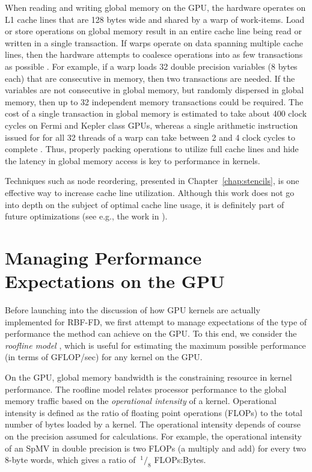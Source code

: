 \documentclass{report}
\begin{document}
When reading and writing global memory on the GPU, the hardware operates on L1 cache lines that are 128 bytes wide and shared by a warp of work-items. Load or store operations on global memory result in an entire cache line being read or written in a single transaction. If warps operate on data spanning multiple cache lines, then the hardware attempts to coalesce operations into as few transactions as possible \cite{CudaGuide2013}. For example, if a warp loads 32 double precision variables (8 bytes each) that are consecutive in memory, then two transactions are needed. If the variables are not consecutive in global memory, but randomly dispersed in global memory, then up to 32 independent memory transactions could be required. The cost of a single transaction in global memory is estimated to take about 400 clock cycles on Fermi and Kepler class GPUs, whereas a single arithmetic instruction issued for for all 32 threads of a warp can take between 2 and 4 clock cycles to complete \cite{CudaGuide2013}. Thus, properly packing operations to utilize full cache lines and hide the latency in global memory access is key to performance in kernels. 

Techniques such as node reordering, presented in Chapter~\ref{chap:stencils}, is one effective way to increase cache line utilization. Although this work does not go into depth on the subject of optimal cache line usage, it is definitely part of future optimizations (see e.g., the work in \cite{ErlebacherSauleFlyerBollig2013}). 



\section{Managing Performance Expectations on the GPU}

Before launching into the discussion of how GPU kernels are actually implemented for RBF-FD, we first attempt to manage expectations of the type of performance the method can achieve on the GPU. To this end, we consider the \emph{roofline model} \cite{Williams2009}, which is useful for estimating the maximum possible performance (in terms of GFLOP/sec) for any kernel on the GPU. 
 
On the GPU, global memory bandwidth is the constraining resource in kernel performance. The roofline model relates processor performance to the global memory traffic based on the \emph{operational intensity} of a kernel. Operational intensity is defined as the ratio of floating point operations (FLOPs) to the total number of bytes loaded by a kernel. The operational intensity depends of course on the precision assumed for calculations. For example, the operational intensity of an SpMV in double precision is two FLOPs (a multiply and add) for every two 8-byte words, which gives a ratio of $\ ^{1}/_{8}$ FLOPs:Bytes. 
\end{document}
